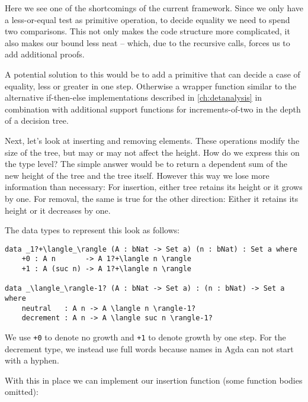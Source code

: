 Here we see one of the shortcomings of the current framework. Since we only have a less-or-equal test as primitive operation, to decide equality we need to spend two comparisons. This not only makes the code structure more complicated, it also makes our bound less neat -- which, due to the recursive calls, forces us to add additional proofs.

A potential solution to this would be to add a primitive that can decide a case of equality, less or greater in one step. Otherwise a wrapper function similar to the alternative if-then-else implementations described in \autoref{ch:detanalysis} in combination with additional support functions for increments-of-two in the depth of a decision tree.

Next, let's look at inserting and removing elements. These operations modify the size of the tree, but may or may not affect the height. How do we express this on the type level? The simple answer would be to return a dependent sum of the new height of the tree and the tree itself. However this way we lose more information than necessary: For insertion, either tree retains its height or it grows by one. For removal, the same is true for the other direction: Either it retains its height or it decreases by one.

The data types to represent this look as follows:

\begin{lstlisting}[caption={Maybe-Increment and Maybe-Decrement},label={lst:tree:inc-type},emph={neutral,decrement}]
data _1?+\langle_\rangle (A : bNat -> Set a) (n : bNat) : Set a where
    +0 : A n       -> A 1?+\langle n \rangle
    +1 : A (suc n) -> A 1?+\langle n \rangle

data _\langle_\rangle-1? (A : bNat -> Set a) : (n : bNat) -> Set a where
    neutral   : A n -> A \langle n \rangle-1?
    decrement : A n -> A \langle suc n \rangle-1?
\end{lstlisting}

We use \texttt{+0} to denote no growth and \texttt{+1} to denote growth by one step. For the decrement type, we instead use full words because names in Agda can not start with a hyphen.

With this in place we can implement our insertion function (some function bodies omitted):


